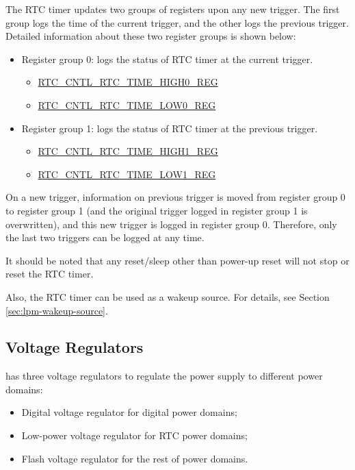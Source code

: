 \documentclass[main\_\_EN.tex]{subfiles}
\begin{document}
The RTC timer updates two groups of registers upon any new trigger. The first group logs the time of the current trigger, and the other logs the previous trigger. Detailed information about these two register groups is shown below:

\begin{itemize}
    \item Register group 0: logs the status of RTC timer at the current trigger.
    \begin{itemize}
        \item \hyperref[regdesc:RTCCNTLRTCTIMEHIGH0REG]{RTC\_CNTL\_RTC\_TIME\_HIGH0\_REG}
        \item \hyperref[regdesc:RTCCNTLRTCTIMELOW0REG]{RTC\_CNTL\_RTC\_TIME\_LOW0\_REG}
    \end{itemize}
    \item Register group 1: logs the status of RTC timer at the previous trigger.
    \begin{itemize}
        \item \hyperref[regdesc:RTCCNTLRTCTIMEHIGH1REG]{RTC\_CNTL\_RTC\_TIME\_HIGH1\_REG}
        \item \hyperref[regdesc:RTCCNTLRTCTIMELOW1REG]{RTC\_CNTL\_RTC\_TIME\_LOW1\_REG}
    \end{itemize}
\end{itemize}

On a new trigger, information on previous trigger is moved from register group 0 to register group 1 (and the original trigger logged in register group 1 is overwritten), and this new trigger is logged in register group 0. Therefore, only the last two triggers can be logged at any time.

It should be noted that any reset/sleep other than power-up reset will not stop or reset the RTC timer.

Also, the RTC timer can be used as a wakeup source. For details, see Section \ref{sec:lpm-wakeup-source}.

\subsection{Voltage Regulators}

\chipname{} has three voltage regulators to regulate the power supply to different power domains:
\begin{itemize}
    \item Digital voltage regulator for digital power domains;
    \item Low-power voltage regulator for RTC power domains;
    \item Flash voltage regulator for the rest of power domains.
\end{itemize}
\end{document}
